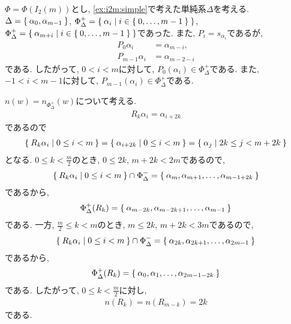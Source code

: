 $\Phi=\Phi(I_2(m))$とし,
\cref{ex:i2m:simple}で考えた単純系$\Delta$を考える.
$\Delta=\Set{\alpha_0,\alpha_{m-1}}$,
$\Phi_\Delta^+=\Set{\alpha_i|i\in\Set{0,\ldots,m-1}}$,
$\Phi_\Delta^+=\Set{\alpha_{m+i}|i\in\Set{0,\ldots,m-1}}$であった.
また, $P_i=s_{\alpha_{i}}$であるが,
\begin{align*}
P_0\alpha_i&=\alpha_{m-i},\\
P_{m-1}\alpha_i&=\alpha_{m-2-i}
\end{align*}
である.
したがって,
$0<i<m$に対して,
$P_0(\alpha_i)\in\Phi_\Delta^+$である.
また, $-1<i<m-1$に対して,
$P_{m-1}(\alpha_i)\in\Phi_\Delta^+$である.

$n(w)=n_{\Phi_\Delta^+}(w)$について考える.
\begin{align*}
  R_k\alpha_i=\alpha_{i+2k}
\end{align*}
であるので
\begin{align*}
\Set{R_k\alpha_i|0\leq i < m}=\Set{\alpha_{i+2k}|0\leq i < m}=\Set{\alpha_{j}|2k \leq j < m+2k}
\end{align*}
となる.
$0\leq k <\frac{m}{2}$のとき, $0\leq 2k$, $m+2k<2m$であるので,
\begin{align*}
  \Set{R_k\alpha_i|0\leq i < m}\cap \Phi_\Delta^-=\Set{\alpha_m,\alpha_{m+1},\ldots,\alpha_{m-1+2k}}
\end{align*}
であるから,
\begin{align*}
  \Phi_\Delta^+(R_k)=\Set{\alpha_{m-2k},\alpha_{m-2k+1},\ldots,\alpha_{m-1}}
\end{align*}
である.
一方,
$\frac{m}{2}\leq k <m$のとき, $m\leq 2k$, $m+2k<3m$であるので,
\begin{align*}
  \Set{R_k\alpha_i|0\leq i < m}\cap \Phi_\Delta^-=\Set{\alpha_{2k},\alpha_{2k+1},\ldots,\alpha_{2m-1}}
\end{align*}
であるから,
\begin{align*}
  \Phi_\Delta^+(R_k)=\Set{\alpha_{0},\alpha_{1},\ldots,\alpha_{2m-1-2k}}
\end{align*}
である.
したがって, $0\leq k <\frac{m}{2}$に対し,
\begin{align*}
  n(R_{k})=n(R_{m-k})=2k 
\end{align*}
である.


